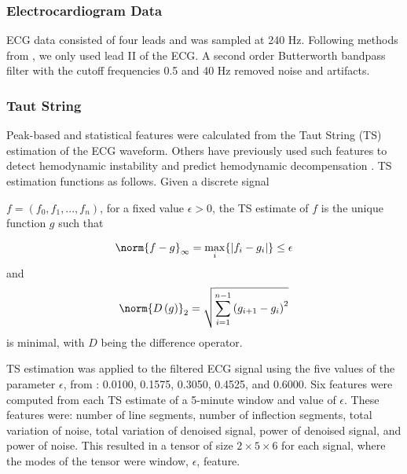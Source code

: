 \subsubsection*{Electrocardiogram Data} \label{sec:methods_ecg_data}
ECG data consisted of four leads and was sampled at 240 Hz. Following methods from \cite{belle_signal_2016}, we only used lead II of the ECG. A second order Butterworth bandpass filter with the cutoff frequencies 0.5 and 40 Hz removed noise and artifacts.

\subsubsection*{Taut String} \label{sec:methods_ts}
Peak-based and statistical features were calculated from the Taut String (TS) estimation \cite{taut_string} of the ECG waveform. Others have previously used such features to detect hemodynamic instability \cite{belle_signal_2016} and predict hemodynamic decompensation \cite{hernandez_multimodal_2021, kim_prediction_2022}. TS estimation functions as follows. Given a discrete signal

$f = (f_0, f_1, ..., f_n)$,
for a fixed value $\epsilon > 0$, the TS estimate of $f$ is the unique function $g$ such that 

\begin{equation*}
    \norm{f - g}_{\infty} = \max\limits_{i}\{ \lvert f_i - g_i \rvert \} \leq \epsilon
\end{equation*}
and
\begin{equation*}
    \norm{D\left( g \right)}_{2} = \sqrt{\sum^{n - 1}_{i = 1} \left( g_{i + 1} - g_i \right)^2}
\end{equation*}
is minimal, with $D$ being the difference operator.

TS estimation was applied to the filtered ECG signal using the five values of the parameter $\epsilon$, from \cite{hernandez_multimodal_2021}: 0.0100, 0.1575, 0.3050, 0.4525, and 0.6000. Six features were computed from each TS estimate of a 5-minute window and value of $\epsilon$. These features were: number of line segments, number of inflection segments, total variation of noise, total variation of denoised signal, power of denoised signal, and power of noise. This resulted in a tensor of size $2 \times 5 \times 6$ for each signal, where the modes of the tensor were window, $\epsilon$, feature. 

